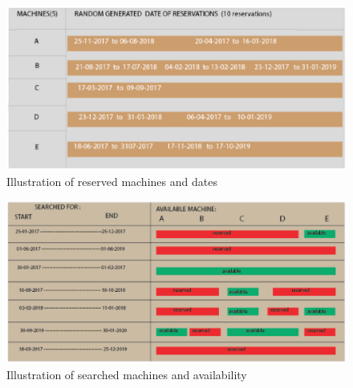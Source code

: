 \begin{figure}
\includegraphics[width=\linewidth]{randreserve1.eps}
\caption{Illustration of reserved machines and dates}
\label{randreserve1}
\end{figure}

\begin{figure}
\includegraphics[width=\linewidth]{randreserve.eps}
\caption{Illustration of searched machines and availability }
\label{randreserve}
\end{figure}

\pagebreak
